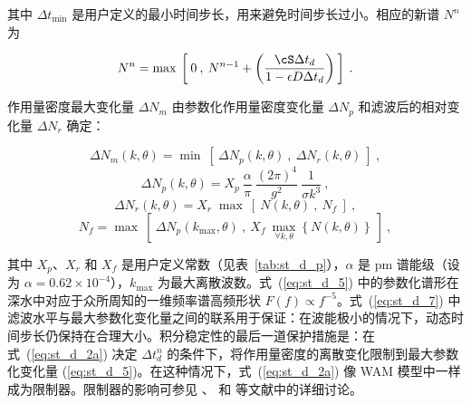 \noindent
其中 $\Delta t_{\min}$ 是用户定义的最小时间步长，用来避免时间步长过小。相应的新谱 $N^n$ 为

\begin{equation}
N^n = \max\: \left [ \: 0 \: , \: N^{n-1} + 
\left ( \frac{\cS \Delta t_d}{1 - \epsilon D \Delta t_d} \right )
\: \right ] \: . \label{eq:st_d_3}
\end{equation}


作用量密度最大变化量 $\Delta N_m$ 由参数化作用量密度变化量 $\Delta N_p$ 和滤波后的相对变化量 $\Delta N_r$ 确定：


\begin{equation}
\Delta N_m (k,\theta) = \min \: \left [ \:
\Delta N_p (k,\theta) \: , \: \Delta N_r (k,\theta) 
\: \right ] \: , \label{eq:st_d_4}
\end{equation} \begin{equation}
\Delta N_p (k,\theta) = X_p \: \frac{\alpha}{\pi} \:
\frac{(2\pi)^4}{g^2} \: \frac{1}{\sigma k^3}
\: , \label{eq:st_d_5}
\end{equation} \begin{equation}
\Delta N_r (k,\theta) = X_r \; \max \: \left [ \: 
N(k,\theta) \: , \: N_f \: \right ] \: , \label{eq:st_d_6}
\end{equation} \begin{equation}
N_f = \max \: \left [ \: \Delta N_p (k_{\max},\theta) \: , 
\: X_f \: \max_{\forall k,\theta} \left \{ N(k,\theta) \right \}
\: \right ] \: , \label{eq:st_d_7} \end{equation}

\noindent 
其中 $X_p$、$X_r$ 和 $X_f$ 是用户定义常数（见表~\ref{tab:st_d_p}），$\alpha$ 是 {\sc pm} 谱能级（设为 $\alpha =
0.62\times 10^{-4}$），$k_{\max}$ 为最大离散波数。式~(\ref{eq:st_d_5}) 中的参数化谱形在深水中对应于众所周知的一维频率谱高频形状
$F(f) \propto f^{-5}$。式~(\ref{eq:st_d_7}) 中滤波水平与最大参数化变化量之间的联系用于保证：在波能极小的情况下，动态时间步长仍保持在合理大小。积分稳定性的最后一道保护措施是：在式~(\ref{eq:st_d_2a}) 决定 $\Delta
t_d^n$ 的条件下，将作用量密度的离散变化限制到最大参数化变化量
(\ref{eq:st_d_5})。在这种情况下，式~(\ref{eq:st_d_2a}) 像 WAM 模型中一样成为限制器。限制器的影响可参见
\cite{art:HJ99,art:HJ01}、\cite{art:HA01} 和 \cite{tol:GAOS02} 等文献中的详细讨论。


